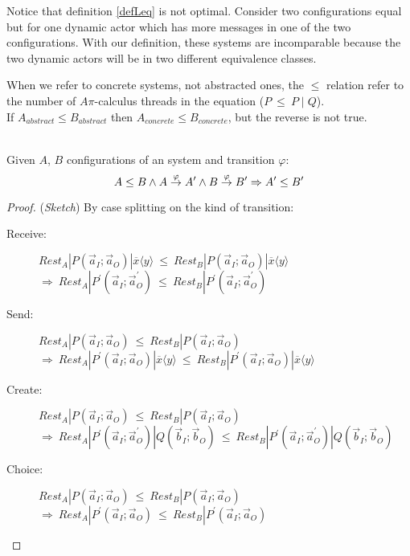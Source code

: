 \documentclass[a4paper]{report}
\numberwithin{algorithm}{chapter}
\begin{document}
\begin{rem}
Notice that definition \ref{defLeq} is not optimal.
Consider two configurations equal but for one dynamic actor which has more messages in one of the two configurations.
With our definition, these systems are incomparable because the two dynamic actors will be in two different equivalence classes.
\end{rem}

\begin{rem}
When we refer to concrete systems, not abstracted ones, the $\leq$ relation refer to the number of $A\pi$-calculus threads in the equation ($P ~ \leq ~ P\;|\;Q$).\\
If $A_{abstract} \leq B_{abstract}$ then $A_{concrete} \leq B_{concrete}$, but the reverse is not true.
\end{rem}

\begin{thm}
\label{thmMonotonicConc} \mbox{}\\
Given $A$, $B$ configurations of an system and transition $\varphi$:
\begin{equation*}
A \leq B \land
A \buildrel\varphi\over\rightarrow A^\prime \land
B \buildrel\varphi\over\rightarrow B^\prime \Rightarrow
A^\prime \leq B^\prime
\end{equation*}
\end{thm}
\begin{proof}
(\emph{Sketch}) By case splitting on the kind of transition:
\begin{description}
\item[Receive:]
$
  \mathit{Rest}_A|P(\vec a_I; \vec a_O)|\overline x \langle y \rangle
~ \leq ~
  \mathit{Rest}_B|P(\vec a_I; \vec a_O)|\overline x \langle y \rangle $\\
$ \Rightarrow ~
  \mathit{Rest}_A|P^\prime(\vec a_I; \vec a^\prime_O)
~ \leq ~
  \mathit{Rest}_B|P^\prime(\vec a_I; \vec a^\prime_O)
$
\item[Send:]
$
  \mathit{Rest}_A|P(\vec a_I; \vec a_O)
~ \leq ~
  \mathit{Rest}_B|P(\vec a_I; \vec a_O) $\\
$ \Rightarrow ~
  \mathit{Rest}_A|P^\prime(\vec a_I; \vec a_O)|\overline x \langle y \rangle
~ \leq ~
  \mathit{Rest}_B|P^\prime(\vec a_I; \vec a_O)|\overline x \langle y \rangle
$
\item[Create:]
$
  \mathit{Rest}_A|P(\vec a_I; \vec a_O)
~ \leq ~
  \mathit{Rest}_B|P(\vec a_I; \vec a_O) $\\
$ \Rightarrow ~
  \mathit{Rest}_A|P^\prime(\vec a_I; \vec a^\prime_O)|Q(\vec b_I; \vec b_O)
~ \leq ~
  \mathit{Rest}_B|P^\prime(\vec a_I; \vec a^\prime_O)|Q(\vec b_I; \vec b_O)
$
\item[Choice:]
$
  \mathit{Rest}_A|P(\vec a_I; \vec a_O)
~ \leq ~
  \mathit{Rest}_B|P(\vec a_I; \vec a_O) $\\
$ \Rightarrow ~
  \mathit{Rest}_A|P^\prime(\vec a_I; \vec a_O)
~ \leq ~
  \mathit{Rest}_B|P^\prime(\vec a_I; \vec a_O)
$
\end{description}
\end{proof}
\end{document}
